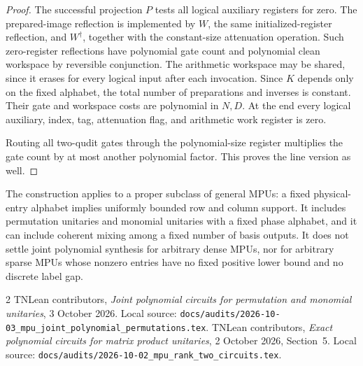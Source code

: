 \documentclass[11pt]{article}
\begin{document}
\begin{proof}
The successful projection $P$ tests all logical auxiliary
registers for zero. The prepared-image reflection is
implemented by $W$, the same initialized-register
reflection, and $W^\dagger$, together with the constant-size
attenuation operation. Such zero-register reflections
have polynomial gate count and polynomial clean
workspace by reversible conjunction. The arithmetic
workspace may be shared, since it erases for every
logical input after each invocation.
Since $K$ depends only on the fixed alphabet, the total
number of preparations and inverses is constant.
Their gate and workspace costs are polynomial in $N,D$.
At the end every logical auxiliary, index, tag, attenuation
flag, and arithmetic work register is zero.

Routing all two-qudit gates through the polynomial-size
register multiplies the gate count by at most another
polynomial factor. This proves the line version as well.
\end{proof}

The construction applies to a proper subclass of general
MPUs: a fixed physical-entry alphabet implies uniformly
bounded row and column support. It includes permutation
unitaries and monomial unitaries with a fixed phase
alphabet, and it can include coherent mixing among a
fixed number of basis outputs. It does not settle joint
polynomial synthesis for arbitrary dense MPUs, nor for
arbitrary sparse MPUs whose nonzero entries have no
fixed positive lower bound and no discrete label gap.

\begin{thebibliography}{2}
TNLean contributors,
\emph{Joint polynomial circuits for permutation and monomial unitaries},
3 October 2026.
Local source:
\nolinkurl{docs/audits/2026-10-03_mpu_joint_polynomial_permutations.tex}.
TNLean contributors,
\emph{Exact polynomial circuits for matrix product unitaries},
2 October 2026, Section~5.
Local source:
\nolinkurl{docs/audits/2026-10-02_mpu_rank_two_circuits.tex}.
\end{thebibliography}
\end{document}
